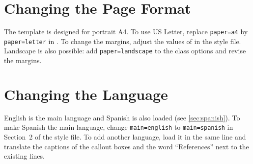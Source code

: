 \section{Changing the Page Format}

The template is designed for portrait A4. To use US Letter, replace
\texttt{paper=a4} by \texttt{paper=letter} in . To change the
margins, adjust the values of  in the style file. Landscape is
also possible: add \texttt{paper=landscape} to the class options and revise
the margins.

\section{Changing the Language}

English is the main language and Spanish is also loaded (see
\cref{sec:spanish}). To make Spanish the main language, change
\texttt{main=english} to \texttt{main=spanish} in Section~2 of the style file.
To add another language, load it in the same  line and translate the
captions of the callout boxes and the word \enquote{References} next to the
existing  lines.
